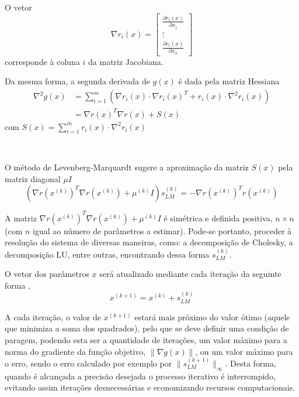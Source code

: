 \documentclass[]{article}
\numberwithin{equation}{subsection}
\begin{document}
O vetor \begin{equation}
\nabla r_i(x)=\begin{bmatrix}
\frac{\partial r_i(x)}{\partial x_1} \\
\vdots \\
\frac{\partial r_i(x)}{\partial x_n}
\end{bmatrix}
\end{equation} corresponde à coluna \(i\) da matriz Jacobiana.

Da mesma forma, a segunda derivada de \(g(x)\) é dada pela matriz
Hessiana \begin{equation} \label{eq:hessiana}
\begin{split}
\nabla^2 g(x) & =\sum_{i=1}^{m}(\nabla r_i(x) \cdot \nabla r_i(x)^T+r_i(x) \cdot \nabla^2 r_i(x))\\
& =\nabla r(x)^T\nabla r(x) + S(x)
\end{split}
\end{equation} com \(S(x)=\sum_{i=1}^{m}r_i(x) \cdot \nabla^2 r_i(x)\)

\(\ \)

O método de Levenberg-Marquardt sugere a aproximação da matriz \(S(x)\)
pela matriz diagonal \(\mu I\) \begin{equation}
(\nabla r(x^{(k)})^T\nabla r(x^{(k)})+\mu^{(k)}I)s^{(k)}_{LM}=-\nabla r(x^{(k)})^T r(x^{(k)})
\end{equation}

A matriz \(\nabla r(x^{(k)})^T\nabla r(x^{(k)})+\mu^{(k)}I\) é simétrica
e definida positiva, \(n \times n\) (com \(n\) igual ao número de
parâmetros a estimar). Pode-se portanto, proceder à resolução do sistema
de diversas maneiras, como: a decomposição de Cholesky, a decomposição
LU, entre outras, encontrando dessa forma \(s^{(k)}_{LM}\).

O vetor dos parâmetros \(x\) será atualizado mediante cada iteração da
seguinte forma \cite{MGDMES11}, \begin{equation}
x^{(k+1)}=x^{(k)}+s^{(k)}_{LM}
\end{equation}

A cada iteração, o valor de \(x^{(k+1)}\) estará mais próximo do valor
ótimo (aquele que minimiza a soma dos quadrados), pelo que se deve
definir uma condição de paragem, podendo esta ser a quantidade de
iterações, um valor máximo para a norma do gradiente da função objetivo,
\(\|\nabla g(x)\|\), ou um valor máximo para o erro, sendo o erro
calculado por exemplo por \(\|s^{(k+1)}_{LM}\|_{\infty}\). Desta forma,
quando é alcançada a precisão desejada o processo iterativo é
interrompido, evitando assim iterações desnecessárias e economizando
recursos computacionais.
\end{document}
